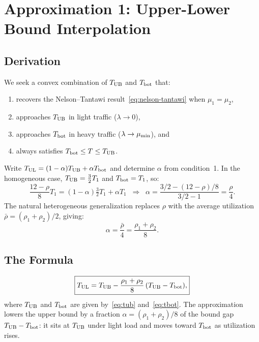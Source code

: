 \section{Approximation 1: Upper-Lower Bound Interpolation}
\label{sec:approx-ul}

\subsection{Derivation}

We seek a convex combination of $T_{\text{UB}}$ and $T_{\text{bot}}$ that:
\begin{enumerate}
  \item recovers the Nelson--Tantawi result~\eqref{eq:nelson-tantawi} when
        $\mu_1 = \mu_2$,
  \item approaches $T_{\text{UB}}$ in light traffic ($\lambda \to 0$),
  \item approaches $T_{\text{bot}}$ in heavy traffic ($\lambda \to \mu_{\min}$), and
  \item always satisfies $T_{\text{bot}} \leq T \leq T_{\text{UB}}$.
\end{enumerate}

Write $T_{\text{UL}} = (1-\alpha)T_{\text{UB}} + \alpha T_{\text{bot}}$ and determine $\alpha$ from
condition~1.
In the homogeneous case, $T_{\text{UB}} = \tfrac{3}{2}T_1$ and $T_{\text{bot}} = T_1$, so:
\begin{equation}
  \frac{12-\rho}{8}T_1 = (1-\alpha)\tfrac{3}{2}T_1 + \alpha T_1
  \;\;\Longrightarrow\;\;
  \alpha = \frac{3/2 - (12-\rho)/8}{3/2 - 1} = \frac{\rho}{4}.
\end{equation}
The natural heterogeneous generalization replaces $\rho$ with the average
utilization $\bar{\rho} = (\rho_1+\rho_2)/2$, giving:
\begin{equation}
  \alpha = \frac{\bar{\rho}}{4} = \frac{\rho_1 + \rho_2}{8}.
\end{equation}

\subsection{The Formula}

\begin{equation}
  \label{eq:tul}
  \boxed{T_{\text{UL}} = T_{\text{UB}} - \frac{\rho_1+\rho_2}{8}\,(T_{\text{UB}} - T_{\text{bot}}),}
\end{equation}
where $T_{\text{UB}}$ and $T_{\text{bot}}$ are given by~\eqref{eq:tub} and~\eqref{eq:tbot}.
The approximation lowers the upper bound by a fraction
$\alpha = (\rho_1+\rho_2)/8$ of the bound gap $T_{\text{UB}} - T_{\text{bot}}$: it sits at $T_{\text{UB}}$
under light load and moves toward $T_{\text{bot}}$ as utilization rises.

